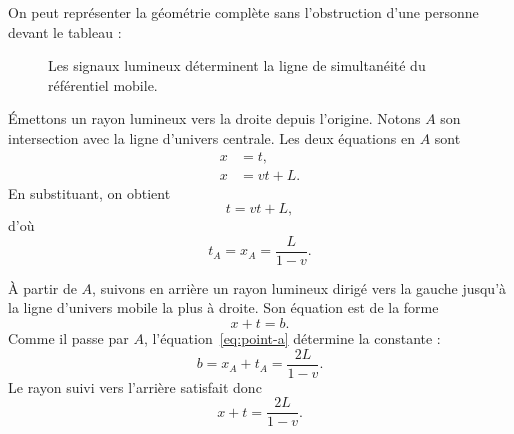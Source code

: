 On peut représenter la géométrie complète sans l’obstruction d’une personne devant le tableau :

\begin{figure}[H]\centering
{}\caption{Les signaux lumineux déterminent la ligne de simultanéité du référentiel mobile.}\end{figure}

Émettons un rayon lumineux vers la droite depuis l’origine. Notons \(A\) son intersection avec la ligne d’univers centrale. Les deux équations en \(A\) sont
\begin{align}
x&=t,\\
x&=vt+L.
\end{align}
En substituant, on obtient
\begin{equation}
t=vt+L,
\end{equation}
d’où
\begin{equation}
t_A=x_A=\frac{L}{1-v}.
\label{eq:point-a}
\end{equation}

À partir de \(A\), suivons en arrière un rayon lumineux dirigé vers la gauche jusqu’à la ligne d’univers mobile la plus à droite. Son équation est de la forme
\begin{equation}
x+t=b.
\end{equation}
Comme il passe par \(A\), l’équation~\eqref{eq:point-a} détermine la constante :
\begin{equation}
b=x_A+t_A=\frac{2L}{1-v}.
\end{equation}
Le rayon suivi vers l’arrière satisfait donc
\begin{equation}
x+t=\frac{2L}{1-v}.
\label{eq:backward-ray}
\end{equation}

